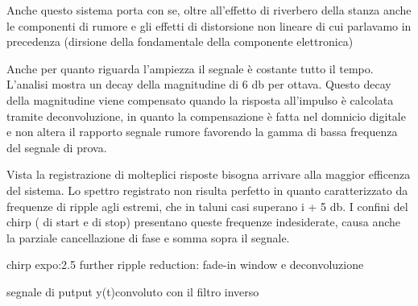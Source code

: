 Anche questo sistema porta con se, oltre all'effetto di riverbero della stanza anche
le componenti di rumore e gli effetti di distorsione non lineare di cui parlavamo in
precedenza (dirsione della fondamentale della componente elettronica)

Anche per quanto riguarda l'ampiezza il segnale è costante tutto il tempo. L'analisi
mostra un decay della magnitudine di 6 db per ottava. Questo decay della magnitudine
viene compensato quando la risposta all'impulso è calcolata tramite deconvoluzione,
in quanto la compensazione è fatta nel domnicio digitale e non altera il rapporto
segnale rumore favorendo la gamma di bassa frequenza del segnale di prova.

Vista la registrazione di molteplici risposte bisogna arrivare alla maggior efficenza
del sistema. Lo spettro registrato non risulta perfetto in quanto caratterizzato da
frequenze di ripple agli estremi, che in taluni casi superano i + 5 db. I confini
del chirp ( di start e di stop) presentano queste frequenze indesiderate, causa
anche la parziale cancellazione di fase e somma sopra il segnale. 


chirp expo:2.5 further ripple reduction: fade-in window  e deconvoluzione

segnale di putput y(t)convoluto con il filtro inverso

\clearpage

